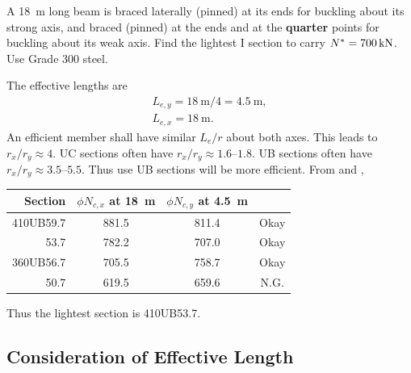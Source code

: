 \begin{exmp}
A \SI{18}{\meter} long beam is braced laterally (pinned) at its ends for buckling about its strong axis, and braced (pinned) at the ends and at the \textbf{quarter} points for buckling about its weak axis. Find the lightest I section to carry $N^*=\SI{700}{\kilo\newton}$. Use Grade 300 steel.
\end{exmp}
\begin{solution}
The effective lengths are
\begin{gather*}
L_{e,y}=\SI{18}{\meter}/4=\SI{4.5}{\meter},\\
L_{e,x}=\SI{18}{\meter}.
\end{gather*}
An efficient member shall have similar $L_{e}/r$ about both axes. This leads to $r_x/r_y\approx4$. UC sections often have $r_x/r_y\approx\numrange{1.6}{1.8}$. UB sections often have $r_x/r_y\approx\numrange{3.5}{5.5}$. Thus use UB sections will be more efficient. From  and ,
\begin{table}[H]
\centering
\begin{tabular}{rccc}
	\toprule
	  Section & $\phi{}N_{c,x}$ at \SI{18}{\meter} & $\phi{}N_{c,y}$ at \SI{4.5}{\meter} &      \\ \midrule
	410UB59.7 &               881.5                &                811.4                & Okay \\
	     53.7 &               782.2                &                707.0                & Okay \\
	360UB56.7 &               705.5                &                758.7                & Okay \\
	     50.7 &               619.5                &                659.6                & N.G. \\ \bottomrule
\end{tabular}
\end{table}
Thus the lightest section is 410UB53.7.
\end{solution}
\subsection{Consideration of Effective Length}
